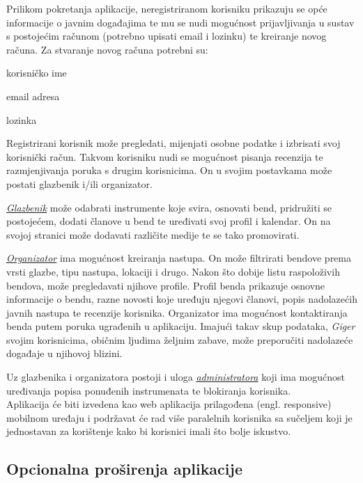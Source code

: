 		Prilikom pokretanja aplikacije, neregistriranom korisniku prikazuju se opće informacije o javnim događajima te mu se nudi mogućnost prijavljivanja u sustav s postojećim računom (potrebno upisati email i lozinku) te kreiranje novog računa. Za stvaranje novog računa potrebni su: 
		
		\begin{packed_item}
			\item korisničko ime
			\item email adresa
			\item lozinka
		\end{packed_item}
	
		Registrirani korisnik može pregledati, mijenjati osobne podatke i izbrisati svoj korisnički račun. Takvom korisniku nudi se mogućnost pisanja recenzija te razmjenjivanja poruka s drugim korisnicima. On u svojim postavkama može postati glazbenik i/ili organizator.
		
		\textit{\underline{Glazbenik}} može odabrati instrumente koje svira, osnovati bend, pridružiti se postojećem, dodati članove u bend te uređivati svoj profil i kalendar. On na svojoj stranici može dodavati različite medije te se tako promovirati. 
		
		\textit{\underline{Organizator}} ima mogućnost kreiranja nastupa. On može filtrirati bendove prema vrsti glazbe, tipu nastupa, lokaciji i drugo. Nakon što dobije listu raspoloživih bendova, može pregledavati njihove profile. Profil benda prikazuje osnovne informacije o bendu, razne novosti koje uređuju njegovi članovi, popis nadolazećih javnih nastupa te recenzije korisnika. Organizator ima mogućnost kontaktiranja benda putem poruka ugrađenih u aplikaciju. Imajući takav skup podataka, \textit{Giger} svojim korisnicima, običnim ljudima željnim zabave, može preporučiti nadolazeće događaje u njihovoj blizini.
		
		Uz glazbenika i organizatora postoji i uloga \textit{\underline{administratora}} koji ima mogućnost uređivanja popisa ponuđenih instrumenata te blokiranja korisnika.
		\\
		
		Aplikacija će biti izvedena kao web aplikacija prilagođena (engl. responsive) mobilnom uređaju i podržavat će rad više paralelnih korisnika sa sučeljem koji je jednostavan za korištenje kako bi korisnici imali što bolje iskustvo.
		
		\subsection{Opcionalna proširenja aplikacije}
		
